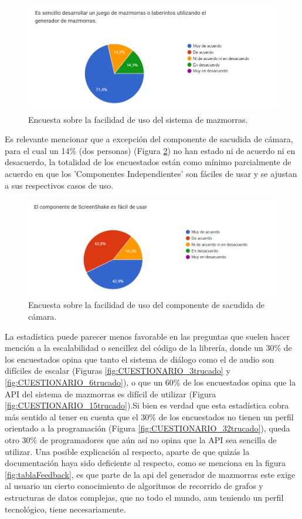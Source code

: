 \begin{figure}[H]
  \centering
  \includegraphics[width=450px,clip=true]{CUESTIONARIO_14.png}
  \caption{Encuesta sobre la facilidad de uso del sistema de mazmorras.}
  \label{fig:CUESTIONARIO_14trucado}
\end{figure}
\raggedbottom

Es relevante mencionar que a excepción del componente de sacudida de cámara, para el cual un 14\% (dos personas) (Figura \ref{fig:CUESTIONARIO_26trucado}) no han estado ni de acuerdo ni en desacuerdo, la totalidad de 
los encuestados están como mínimo parcialmente de acuerdo en que los 'Componentes Independientes' son fáciles de usar y se ajustan a sus respectivos casos de uso.

\begin{figure}[H]
  \centering
  \includegraphics[width=450px,clip=true]{CUESTIONARIO_26.png}
  \caption{Encuesta sobre la facilidad de uso del componente de sacudida de cámara.}
  \label{fig:CUESTIONARIO_26trucado}
\end{figure}
\raggedbottom

La estadística puede parecer menos favorable en las preguntas que suelen hacer mención a la escalabilidad o sencillez del código de la librería, donde un 30\% de los encuestados opina que tanto el sistema de
 diálogo como el de audio son difíciles de escalar (Figuras \ref{fig:CUESTIONARIO_3trucado} y \ref{fig:CUESTIONARIO_6trucado}), o que un 60\% de los encuestados opina que la API del sistema de mazmorras es
  difícil de utilizar (Figura \ref{fig:CUESTIONARIO_15trucado}).Si bien es verdad que esta estadística cobra más sentido al tener en cuenta que el 30\% de los encuestados no tienen un perfil orientado a
   la programación (Figura \ref{fig:CUESTIONARIO_32trucado}), queda otro 30\% de programadores que aún así no opina que la API sea sencilla de utilizar. Una posible explicación al respecto, aparte de que quizás la
   documentación haya sido deficiente al respecto, como se menciona en la figura \ref{fig:tablaFeedback}, es que parte de la api del generador de mazmorras este exige al usuario un cierto
    conocimiento de algoritmos de recorrido de grafos y estructuras de datos complejas, que no todo el mundo, aun teniendo un perfil tecnológico, tiene necesariamente. 

